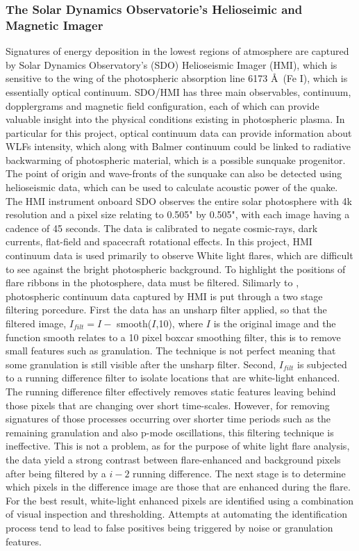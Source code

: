 \subsubsection{The Solar Dynamics Observatorie's Helioseimic and Magnetic Imager}
Signatures of energy deposition in the lowest regions of atmosphere are captured by Solar Dynamics Observatory's (SDO) Helioseismic Imager (HMI), which is sensitive to the wing of the photospheric absorption line 6173 \AA\ (Fe I), which is essentially optical continuum. SDO/HMI has three main observables, continuum, dopplergrams and magnetic field configuration, each of which can provide valuable insight into the physical conditions existing in photospheric plasma. In particular for this project, optical continuum data can provide information about WLFs intensity, which along with Balmer continuum could be linked to radiative backwarming of photospheric material, which is a possible sunquake progenitor. The point of origin and wave-fronts of the sunquake can also be detected using helioseismic data, which can be used to calculate acoustic power of the quake.
The HMI instrument onboard SDO observes the entire solar photosphere with 4k resolution and a pixel size relating to 0.505" by 0.505", with each image having a cadence of 45 seconds. The data is calibrated to negate cosmic-rays, dark currents, flat-field and spacecraft rotational effects. In this project, HMI continuum data is used primarily to observe White light flares, which are difficult to see against the bright photospheric background. To highlight the positions of flare ribbons in the photosphere, data must be filtered. Silimarly to \cite{2014ApJ...783...98K}, photospheric continuum data captured by HMI is put through a two stage filtering porcedure. First the data has an unsharp filter applied, so that the filtered image, $I_{filt}=I-$ smooth($I$,10), where $I$ is the original image and the function smooth relates to a 10 pixel boxcar smoothing filter, this is to remove small features such as granulation. The technique is not perfect meaning that some granulation is still visible after the unsharp filter. Second, $I_{filt}$ is subjected to a running difference filter to isolate locations that are white-light enhanced. The running difference filter effectively removes static features leaving behind those pixels that are changing over short time-scales. However, for removing signatures of those processes occurring over shorter time periods such as the remaining granulation and also p-mode oscillations, this filtering technique is ineffective. This is not a problem, as for the purpose of white light flare analysis, the data yield a strong contrast between flare-enhanced and background pixels after being filtered by a $i-2$ running difference. The next stage is to determine which pixels in the difference image are those that are enhanced during the flare. For the best result, white-light enhanced pixels are identified using a combination of visual inspection and thresholding. Attempts at automating the identification process tend to lead to false positives being triggered by noise or granulation features. \\
